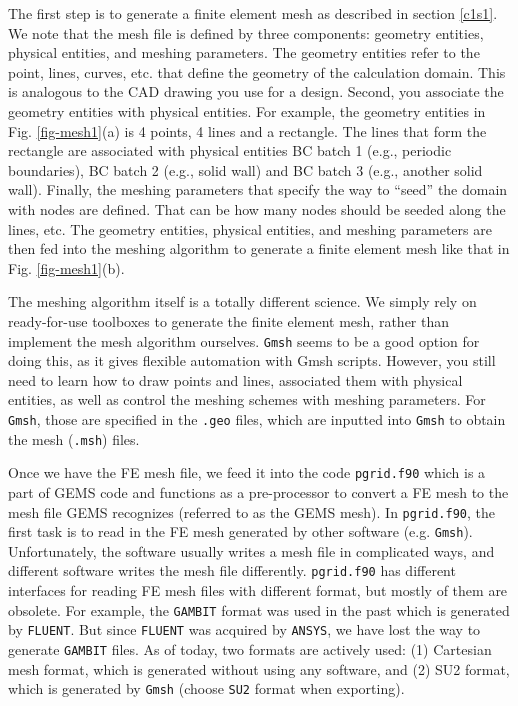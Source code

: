 \documentclass[12pt, letterpaper]{report}
\begin{document}
The first step is to generate a finite element mesh as described in section \ref{c1s1}. We note that
the mesh file is defined by three components: geometry entities, physical entities, and meshing
parameters. The geometry entities refer to the point, lines, curves, etc. that define the geometry
of the calculation domain. This is analogous to the CAD drawing you use for a design. Second, you
associate the geometry entities with physical entities. For example, the geometry entities in Fig.
\ref{fig-mesh1}(a) is 4 points, 4 lines and a rectangle. The lines that form the rectangle are
associated with physical entities BC batch 1 (e.g., periodic boundaries), BC batch 2 (e.g., solid
wall) and BC batch 3 (e.g., another solid wall). Finally, the meshing parameters that specify the
way to ``seed'' the domain with nodes are defined. That can be how many nodes should be seeded along
the lines, etc. The geometry entities, physical entities, and meshing parameters are then fed into
the meshing algorithm to generate a finite element mesh like that in Fig. \ref{fig-mesh1}(b).
\paraspace

The meshing algorithm itself is a totally different science. We simply rely on ready-for-use
toolboxes to generate the finite element mesh, rather than implement the mesh algorithm ourselves.
\verb+Gmsh+ seems to be a good option for doing this, as it gives flexible automation with Gmsh
scripts. However, you still need to learn how to draw points and lines, associated them with physical
entities, as well as control the meshing schemes with meshing parameters. For \verb+Gmsh+, those are
specified in the \verb+.geo+ files, which are inputted into \verb+Gmsh+ to obtain the mesh
(\verb+.msh+) files.
\paraspace

Once we have the FE mesh file, we feed it into the code \verb+pgrid.f90+ which is a part of GEMS
code and functions as a pre-processor to convert a FE mesh to the mesh file GEMS recognizes
(referred to as the GEMS mesh). In \verb+pgrid.f90+, the first task is to read in the FE mesh
generated by other software (e.g. \verb+Gmsh+). Unfortunately, the software usually writes a mesh
file in complicated ways, and different software writes the mesh file differently. \verb+pgrid.f90+
has different interfaces for reading FE mesh files with different format, but mostly of them are
obsolete. For example, the \verb+GAMBIT+ format was used in the past which is generated by
\verb+FLUENT+. But since \verb+FLUENT+ was acquired by \verb+ANSYS+, we have lost the way to
generate \verb+GAMBIT+ files.  As of today, two formats are actively used: (1) Cartesian mesh
format, which is generated without using any software, and (2) SU2 format, which is generated by
\verb+Gmsh+ (choose \verb+SU2+ format when exporting).  \paraspace
\end{document}
